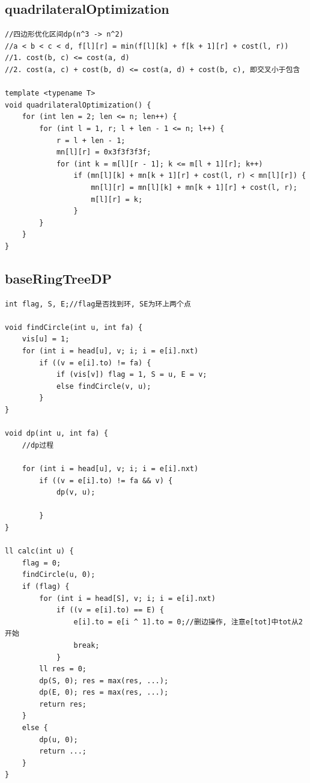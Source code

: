 \documentclass[twoside]{article}
\begin{document}
\subsection{quadrilateralOptimization}
\begin{lstlisting}
//四边形优化区间dp(n^3 -> n^2)
//a < b < c < d, f[l][r] = min(f[l][k] + f[k + 1][r] + cost(l, r))
//1. cost(b, c) <= cost(a, d)
//2. cost(a, c) + cost(b, d) <= cost(a, d) + cost(b, c), 即交叉小于包含

template <typename T>
void quadrilateralOptimization() {
    for (int len = 2; len <= n; len++) {
        for (int l = 1, r; l + len - 1 <= n; l++) {
            r = l + len - 1;
            mn[l][r] = 0x3f3f3f3f;
            for (int k = m[l][r - 1]; k <= m[l + 1][r]; k++)
                if (mn[l][k] + mn[k + 1][r] + cost(l, r) < mn[l][r]) {
                    mn[l][r] = mn[l][k] + mn[k + 1][r] + cost(l, r);
                    m[l][r] = k;
                }
        }
    }
}
\end{lstlisting}
\subsection{baseRingTreeDP}
\begin{lstlisting}
int flag, S, E;//flag是否找到环, SE为环上两个点

void findCircle(int u, int fa) {
    vis[u] = 1;
    for (int i = head[u], v; i; i = e[i].nxt)
        if ((v = e[i].to) != fa) {
            if (vis[v]) flag = 1, S = u, E = v;
            else findCircle(v, u);
        }
}

void dp(int u, int fa) {
    //dp过程

    for (int i = head[u], v; i; i = e[i].nxt)
        if ((v = e[i].to) != fa && v) {
            dp(v, u);

        }
}

ll calc(int u) {
    flag = 0;
    findCircle(u, 0);
    if (flag) {
        for (int i = head[S], v; i; i = e[i].nxt)
            if ((v = e[i].to) == E) {
                e[i].to = e[i ^ 1].to = 0;//删边操作, 注意e[tot]中tot从2开始
                break;
            }
        ll res = 0;
        dp(S, 0); res = max(res, ...);
        dp(E, 0); res = max(res, ...);
        return res;
    }
    else {
        dp(u, 0);
        return ...;
    }
}
\end{lstlisting}
\end{document}
